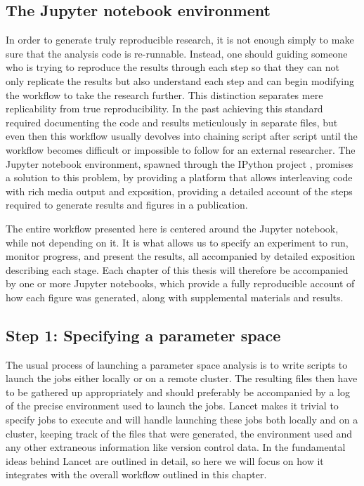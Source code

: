 \subsection{The Jupyter notebook environment}

In order to generate truly reproducible research, it is not enough
simply to make sure that the analysis code is re-runnable. Instead,
one should guiding someone who is trying to reproduce the results through each
step so that they can not only replicate the results but also understand
each step and can begin modifying the workflow to take the
research further. This distinction separates mere replicability
from true reproducibility. In the past achieving this standard required documenting the
code and results meticulously in separate files, but even then this
workflow usually devolves into chaining script after script until the
workflow becomes difficult or impossible to follow for an external
researcher. The Jupyter notebook environment, spawned through the
IPython project \citep{Perez2007}, promises a solution to this problem,
by providing a platform that allows interleaving code with rich media
output and exposition, providing a detailed account of the steps
required to generate results and figures in a publication.

The entire workflow presented here is centered around the Jupyter
notebook, while not depending on it. It is what allows us to specify
an experiment to run, monitor progress, and present the results, all
accompanied by detailed exposition describing each stage. Each chapter
of this thesis will therefore be accompanied by one or more Jupyter
notebooks, which provide a fully reproducible account of how each
figure was generated, along with supplemental materials and results.

\subsection{Step 1: Specifying a parameter space}

The usual process of launching a parameter space analysis is to write
scripts to launch the jobs either locally or on a remote cluster. The
resulting files then have to be gathered up appropriately and should
preferably be accompanied by a log of the precise environment used to
launch the jobs. Lancet makes it trivial to specify jobs to execute
and will handle launching these jobs both locally and on a cluster,
keeping track of the files that were generated, the environment used
and any other extraneous information like version control data. In
\cite{Stevens2013a} the fundamental ideas behind Lancet are outlined
in detail, so here we will focus on how it integrates with the overall
workflow outlined in this chapter.

